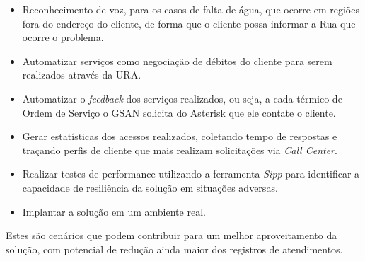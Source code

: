 \begin{itemize}
	\item Reconhecimento de voz, para os casos de falta de água, que ocorre em regiões fora do endereço do cliente, de forma que o cliente possa informar a Rua que ocorre o problema.
	\item Automatizar serviços como negociação de débitos do cliente para serem realizados através da URA.
	\item Automatizar o \textit{feedback} dos serviços realizados, ou seja, a cada térmico de Ordem de Serviço o GSAN solicita do Asterisk que ele contate o cliente.
	\item Gerar estatísticas dos acessos realizados, coletando tempo de respostas e traçando perfis de cliente que mais realizam solicitações via \textit{Call Center}.
	\item Realizar testes de performance utilizando a ferramenta \textit{Sipp} para identificar a capacidade de resiliência da solução em situações adversas. 
	\item Implantar a solução em um ambiente real.
\end{itemize}


Estes são cenários que podem contribuir para um melhor aproveitamento da solução, com potencial de redução ainda maior dos registros de atendimentos. 
